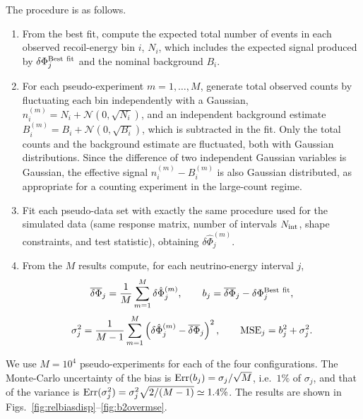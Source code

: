 The procedure is as follows.
\begin{enumerate}
\item From the best fit, compute the expected total number of events in
each observed recoil-energy bin $i$, $N_i$, which includes the expected
signal produced by $\delta\Phi_j^{\rm Best\ fit}$ and the nominal
background $B_i$.
\item For each pseudo-experiment $m=1,\dots,M$, generate total observed
counts by fluctuating each bin independently with a Gaussian,
$n_i^{(m)}=N_i+\mathcal{N}(0,\sqrt{N_i})$, and an independent background
estimate $B_i^{(m)}=B_i+\mathcal{N}(0,\sqrt{B_i})$, which is subtracted in
the fit.  Only the total counts and the background estimate are
fluctuated, both with Gaussian distributions.  Since the difference of two
independent Gaussian variables is Gaussian, the effective signal
$n_i^{(m)}-B_i^{(m)}$ is also Gaussian distributed, as appropriate for a
counting experiment in the large-count regime.
\item Fit each pseudo-data set with exactly the same procedure used for
the simulated data (same response matrix, number of intervals
$N_{\rm int}$, shape constraints, and test statistic), obtaining
$\delta\hat\Phi_j^{(m)}$.
\item From the $M$ results compute, for each neutrino-energy interval $j$,
\begin{equation}
\overline{\delta\Phi}_j=\frac{1}{M}\sum_{m=1}^{M}\delta\hat\Phi_j^{(m)},
\qquad
b_j=\overline{\delta\Phi}_j-\delta\Phi_j^{\rm Best\ fit},
\end{equation}
\begin{equation}
\sigma_j^2=\frac{1}{M-1}\sum_{m=1}^{M}
\left(\delta\hat\Phi_j^{(m)}-\overline{\delta\Phi}_j\right)^{2},
\qquad
{\rm MSE}_j=b_j^2+\sigma_j^2 .
\end{equation}
\end{enumerate}

We use $M=10^4$ pseudo-experiments for each of the four configurations.
The Monte-Carlo uncertainty of the bias is
${\rm Err}(b_j)=\sigma_j/\sqrt{M}$, i.e.\ $1\%$ of $\sigma_j$, and that of
the variance is
${\rm Err}(\sigma_j^2)=\sigma_j^2\sqrt{2/(M-1)}\simeq1.4\%$.
The results are shown in
Figs.~\ref{fig:relbiasdisp}--\ref{fig:b2overmse}.

